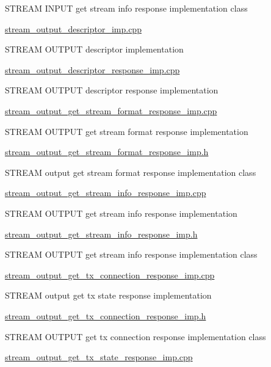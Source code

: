 S\+T\+R\+E\+AM I\+N\+P\+UT get stream info response implementation class

\hyperlink{stream__output__descriptor__imp_8cpp}{stream\+\_\+output\+\_\+descriptor\+\_\+imp.\+cpp}

S\+T\+R\+E\+AM O\+U\+T\+P\+UT descriptor implementation

\hyperlink{stream__output__descriptor__response__imp_8cpp}{stream\+\_\+output\+\_\+descriptor\+\_\+response\+\_\+imp.\+cpp}

S\+T\+R\+E\+AM O\+U\+T\+P\+UT descriptor response implementation

\hyperlink{stream__output__get__stream__format__response__imp_8cpp}{stream\+\_\+output\+\_\+get\+\_\+stream\+\_\+format\+\_\+response\+\_\+imp.\+cpp}

S\+T\+R\+E\+AM O\+U\+T\+P\+UT get stream format response implementation

\hyperlink{stream__output__get__stream__format__response__imp_8h}{stream\+\_\+output\+\_\+get\+\_\+stream\+\_\+format\+\_\+response\+\_\+imp.\+h}

S\+T\+R\+E\+AM output get stream format response implementation class

\hyperlink{stream__output__get__stream__info__response__imp_8cpp}{stream\+\_\+output\+\_\+get\+\_\+stream\+\_\+info\+\_\+response\+\_\+imp.\+cpp}

S\+T\+R\+E\+AM O\+U\+T\+P\+UT get stream info response implementation

\hyperlink{stream__output__get__stream__info__response__imp_8h}{stream\+\_\+output\+\_\+get\+\_\+stream\+\_\+info\+\_\+response\+\_\+imp.\+h}

S\+T\+R\+E\+AM O\+U\+T\+P\+UT get stream info response implementation class

\hyperlink{stream__output__get__tx__connection__response__imp_8cpp}{stream\+\_\+output\+\_\+get\+\_\+tx\+\_\+connection\+\_\+response\+\_\+imp.\+cpp}

S\+T\+R\+E\+AM output get tx state response implementation

\hyperlink{stream__output__get__tx__connection__response__imp_8h}{stream\+\_\+output\+\_\+get\+\_\+tx\+\_\+connection\+\_\+response\+\_\+imp.\+h}

S\+T\+R\+E\+AM O\+U\+T\+P\+UT get tx connection response implementation class

\hyperlink{stream__output__get__tx__state__response__imp_8cpp}{stream\+\_\+output\+\_\+get\+\_\+tx\+\_\+state\+\_\+response\+\_\+imp.\+cpp}

